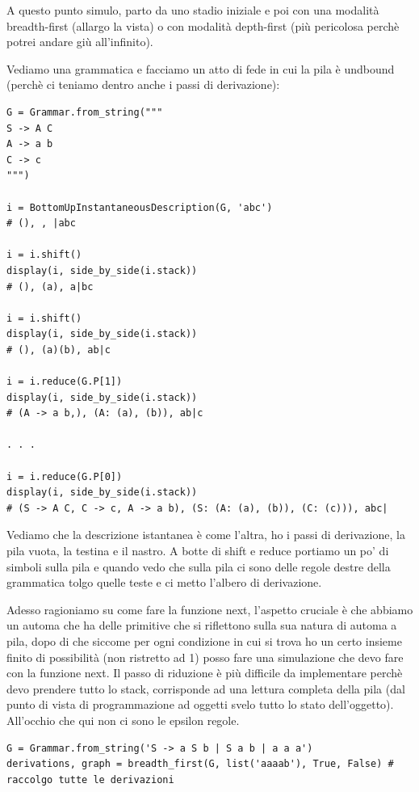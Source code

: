 A questo punto simulo, parto da uno stadio iniziale e poi con una modalità breadth-first (allargo la vista) o con modalità depth-first (più pericolosa perchè potrei andare giù all'infinito).

Vediamo una grammatica e facciamo un atto di fede in cui la pila è undbound (perchè ci teniamo dentro anche i passi di derivazione):

\begin{lstlisting}
G = Grammar.from_string("""
S -> A C
A -> a b
C -> c
""")

i = BottomUpInstantaneousDescription(G, 'abc')
# (), , |abc

i = i.shift()
display(i, side_by_side(i.stack))
# (), (a), a|bc

i = i.shift()
display(i, side_by_side(i.stack))
# (), (a)(b), ab|c

i = i.reduce(G.P[1])
display(i, side_by_side(i.stack))
# (A -> a b,), (A: (a), (b)), ab|c

. . .

i = i.reduce(G.P[0])
display(i, side_by_side(i.stack))
# (S -> A C, C -> c, A -> a b), (S: (A: (a), (b)), (C: (c))), abc|
\end{lstlisting}

Vediamo che la descrizione istantanea è come l'altra, ho i passi di derivazione, la pila vuota, la testina e il nastro.
A botte di shift e reduce portiamo un po' di simboli sulla pila e quando vedo che sulla pila ci sono delle regole destre della grammatica tolgo quelle teste e ci metto l'albero di derivazione.

Adesso ragioniamo su come fare la funzione next, l'aspetto cruciale è che abbiamo un automa che ha delle primitive che si riflettono sulla sua natura di automa a pila, dopo di che siccome per ogni condizione in cui si trova ho un certo insieme finito di possibilità (non ristretto ad 1) posso fare una simulazione che devo fare con la funzione next.
Il passo di riduzione è più difficile da implementare perchè devo prendere tutto lo stack, corrisponde ad una lettura completa della pila (dal punto di vista di programmazione ad oggetti svelo tutto lo stato dell'oggetto). All'occhio che qui non ci sono le epsilon regole.

\begin{lstlisting}
G = Grammar.from_string('S -> a S b | S a b | a a a')
derivations, graph = breadth_first(G, list('aaaab'), True, False) # raccolgo tutte le derivazioni
\end{lstlisting}

